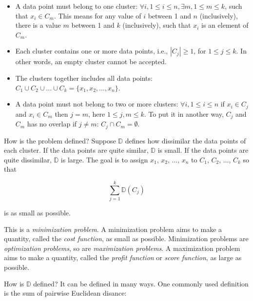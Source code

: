 \begin{itemize}
\item A data point must belong to one cluster: $\forall i, 1 \le i \le
  n, \exists m, 1 \le m \le k$, such that $x_i \in C_m$. This means
  for any value of $i$ between 1 and $n$ (inclusively), there is a
  value $m$ between 1 and $k$ (inclusively), such that $x_i$ is an
  element of $C_m$.

  
\item Each cluster contains one or more data points, i.e.,
  $|C_j| \ge 1$, for $1 \le j \le k$.  In other words, an
  empty cluster cannot be accepted.
  
\item The clusters together includes all data points: $C_1 \cup C_2
  \cup ... \cup C_k = \{x_1, x_2, ..., x_n\}$.

\item A data point must not belong to two or more clusters: $\forall
  i, 1 \le i \le n$ if $x_i \in C_j$ and $x_i \in C_m$ then $j = m$,
  here $1 \le j, m \le k$.  To put it in another way, $C_j$ and $C_m$
  has no overlap if $j \ne m$: $C_j \cap C_m = \emptyset$.
  
\end{itemize}

How is the problem defined? Suppose $\mathds{D}$ defines how
dissimilar the data points of each cluster.  If the data points are
quite similar, $\mathds{D}$ is small.  If the data points are quite
dissimilar, $\mathds{D}$ is large.  The goal is to assign
$x_1$, $x_2$, ..., $x_n$ to $C_1$, $C_2$, ..., $C_k$
so that

\begin{equation}
  \underset{j = 1}{\overset{k}{\sum}} \mathds{D}(C_j)
  \label{eqn:kmeancost1}
\end{equation}

is as small as possible.

This is a {\it minimization problem}. A minimization problem aims to
make a quantity, called the {\it cost function}, as small as possible.
Minimization problems are {\it optimization problems}, so are {\it
  maximization problems}.  A maximization problem aims to make a
quantity, called the {\it profit function} or {\it score function}, as
large as possible.


How is $\mathds{D}$ defined?  It can be defined in many ways. One commonly
used definition is the sum of pairwise Euclidean disance:


